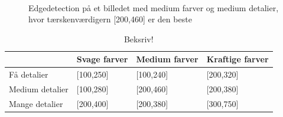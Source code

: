 \begin{figure}[!h]
    \centering
    \\
        \caption[]{Edgedetection på et billedet med medium farver og medium detalier, hvor tærskenværdigern [200,460] er den beste}
     \label{tre}
\end{figure}

\begin{table}[!h]
    \centering
    \begin{tabular}{| l | l | l | l |} \hline
        & Svage farver 	& Medium farver & Kraftige farver \\ \hline
        Få detalier 		& [100,250]		& [100,240]		& [200,320]\\ \hline
        Medium detalier 	& [100,280]		& [200,460]		& [200,380]\\ \hline
        Mange detalier		& [200,400]		& [200,380]		& [300,750]\\ \hline
    \end{tabular}
    \caption{Beksriv!}
    \label{thressholdsTabelKant}
\end{table}


